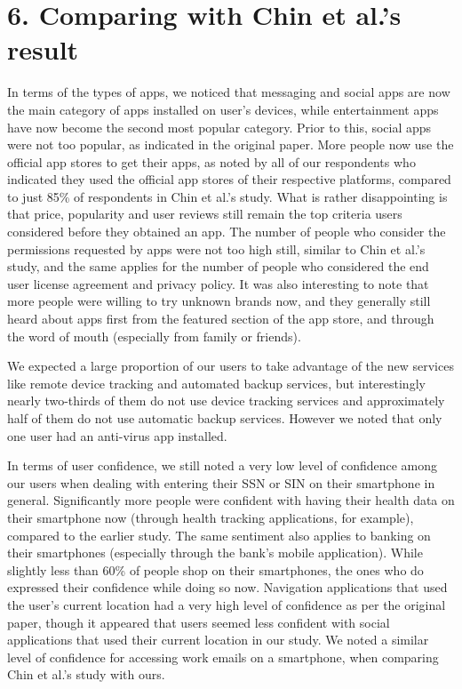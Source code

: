 \documentclass{sigchi}
\begin{document}
\section{6. Comparing with Chin et al.'s result}

In terms of the types of apps, we noticed that messaging and social apps are now the main category of apps installed on user's devices, while entertainment apps have now become the second most popular category. Prior to this, social apps were not too popular, as indicated in the original paper. More people now use the official app stores to get their apps, as noted by all of our respondents who indicated they used the official app stores of their respective platforms, compared to just 85\% of respondents in Chin et al.'s study. What is rather disappointing is that price, popularity and user reviews still remain the top criteria users considered before they obtained an app. The number of people who consider the permissions requested by apps were not too high still, similar to Chin et al.'s study, and the same applies for the number of people who considered the end user license agreement and privacy policy. It was also interesting to note that more people were willing to try unknown brands now, and they generally still heard about apps first from the featured section of the app store, and through the word of mouth (especially from family or friends).

We expected a large proportion of our users to take advantage of the new services like remote device tracking and automated backup services, but interestingly nearly two-thirds of them do not use device tracking services and approximately half of them do not use automatic backup services. However we noted that only one user had an anti-virus app installed.

In terms of user confidence, we still noted a very low level of confidence among our users when dealing with entering their SSN or SIN on their smartphone in general. Significantly more people were confident with having their health data on their smartphone now (through health tracking applications, for example), compared to the earlier study. The same sentiment also applies to banking on their smartphones (especially through the bank's mobile application). While slightly less than 60\% of people shop on their smartphones, the ones who do expressed their confidence while doing so now. Navigation applications that used the user's current location had a very high level of confidence as per the original paper, though it appeared that users seemed less confident with social applications that used their current location in our study. We noted a similar level of confidence for accessing work emails on a smartphone, when comparing Chin et al.'s study with ours.
\end{document}

